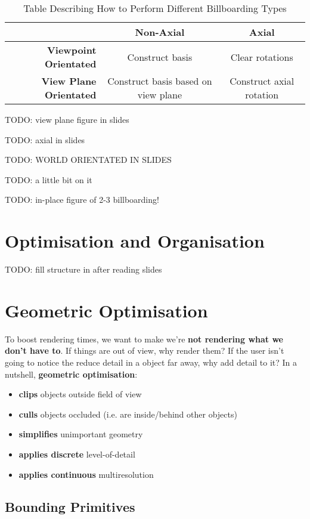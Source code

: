 \documentclass{article}
\begin{document}
\begin{table}[H]
	\centering
	\begin{tabular}{|r|c|c|}
		\hline
		& \textbf{Non-Axial} & \textbf{Axial} \\
		\hline
		\textbf{Viewpoint Orientated} & Construct basis & Clear rotations \\	
		\textbf{View Plane Orientated} & Construct basis based on view plane & Construct axial rotation \\
		\hline
	\end{tabular}
	\caption{Table Describing How to Perform Different Billboarding Types}
	\label{eq:billboard-types}
\end{table}

TODO: view plane figure in slides

TODO: axial in slides

TODO: WORLD ORIENTATED IN SLIDES

TODO: a little bit on it

TODO: in-place figure of 2-3 billboarding!

\section{Optimisation and Organisation}

TODO: fill structure in after reading slides

\section{Geometric Optimisation}

To boost rendering times, we want to make we're \textbf{not rendering what we don't have to}. If things are out of view, why render them? If the user isn't going to notice the reduce detail in a object far away, why add detail to it? In a nutshell, \textbf{geometric optimisation}:
\begin{itemize}
	\item \textbf{clips} objects outside field of view
	\item \textbf{culls} objects occluded (i.e. are inside/behind other objects)
	\item \textbf{simplifies} unimportant geometry
	\item \textbf{applies discrete} level-of-detail
	\item \textbf{applies continuous} multiresolution
\end{itemize}

\subsection{Bounding Primitives}
\end{document}
